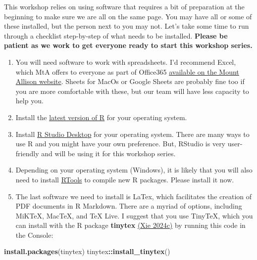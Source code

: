 \documentclass[
]{book}
\newenvironment{Shaded}{\begin{snugshade}}{\end{snugshade}}
\newcommand{\FunctionTok}[1]{\textcolor[rgb]{0.13,0.29,0.53}{\textbf{#1}}}
\newcommand{\NormalTok}[1]{#1}
\newcommand{\SpecialCharTok}[1]{\textcolor[rgb]{0.81,0.36,0.00}{\textbf{#1}}}
\newcommand{\StringTok}[1]{\textcolor[rgb]{0.31,0.60,0.02}{#1}}
\begin{document}
This workshop relies on using software that requires a bit of preparation at the beginning to make sure we are all on the same page. You may have all or some of these installed, but the person next to you may not. Let's take some time to run through a checklist step-by-step of what needs to be installed. \textbf{Please be patient as we work to get everyone ready to start this workshop series.}

\begin{enumerate}
\def\labelenumi{\arabic{enumi}.}
\item
  You will need software to work with spreadsheets. I'd recommend Excel, which MtA offers to everyone as part of Office365 \href{https://mta.ca/current-students/tech-help-students/email-and-office-365-students}{available on the Mount Allison website}. Sheets for MacOs or Google Sheets are probably fine too if you are more comfortable with these, but our team will have less capacity to help you.
\item
  Install the \href{https://cran.csiro.au/}{latest version of R} for your operating system.
\item
  Install \href{https://www.rstudio.com/products/rstudio/}{R Studio Desktop} for your operating system. There are many ways to use R and you might
  have your own preference. But, RStudio is very user-friendly and will be using it for this workshop series.
\item
  Depending on your operating system (Windows), it is likely that you will also need to install \href{https://cran.r-project.org/bin/windows/Rtools/}{RTools} to compile new R packages. Please install it now.
\item
  The last software we need to install is LaTex, which facilitates the creation of PDF documents in R Markdown. There are a myriad of options, including MiKTeX, MacTeX, and TeX Live. I suggest that you use TinyTeX, which you can install with the R package \textbf{tinytex} \href{https://github.com/rstudio/tinytex}{(Xie 2024c)} by running this code in the Console:
\end{enumerate}

\begin{Shaded}
\begin{Highlighting}[]
\FunctionTok{install.packages}\NormalTok{(}\StringTok{\textquotesingle{}tinytex\textquotesingle{}}\NormalTok{)}
\NormalTok{tinytex}\SpecialCharTok{::}\FunctionTok{install\_tinytex}\NormalTok{()}
\end{Highlighting}
\end{Shaded}
\end{document}
